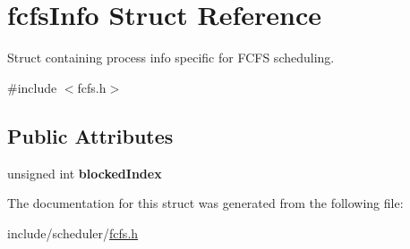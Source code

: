 \hypertarget{structfcfsInfo}{\section{fcfs\-Info \-Struct \-Reference}
\label{d5/d4c/structfcfsInfo}
}


\-Struct containing process info specific for \-F\-C\-F\-S scheduling.  




{\ttfamily \#include $<$fcfs.\-h$>$}

\subsection*{\-Public \-Attributes}
\begin{DoxyCompactItemize}
\item 
\hypertarget{structfcfsInfo_a994331c8dd9b432273d61e44e17807fd}{unsigned int {\bfseries blocked\-Index}}\label{d5/d4c/structfcfsInfo_a994331c8dd9b432273d61e44e17807fd}

\end{DoxyCompactItemize}


\-The documentation for this struct was generated from the following file\-:\begin{DoxyCompactItemize}
\item 
include/scheduler/\hyperlink{fcfs_8h}{fcfs.\-h}\end{DoxyCompactItemize}
